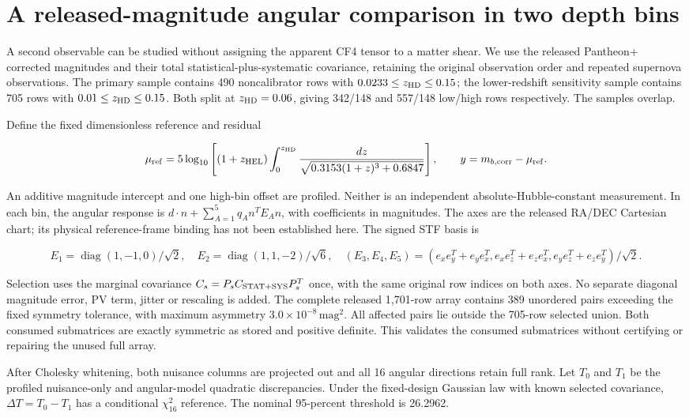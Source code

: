 \section{A released-magnitude angular comparison in two depth bins}
A second observable can be studied without assigning the apparent CF4
tensor to a matter shear. We use the released Pantheon+ corrected
magnitudes and their total statistical-plus-systematic covariance,
retaining the original observation order and repeated supernova
observations. The primary sample contains 490 noncalibrator rows with
\(0.0233\le z_{\rm HD}\le0.15\); the lower-redshift sensitivity sample
contains 705 rows with \(0.01\le z_{\rm HD}\le0.15\). Both split at
\(z_{\rm HD}=0.06\), giving 342/148 and 557/148 low/high rows
respectively. The samples overlap.

Define the fixed dimensionless reference and residual

\[
 \mu_{\rm ref}=5\log_{10}\left[(1+z_{\rm HEL})
 \int_0^{z_{\rm HD}}\frac{dz}{\sqrt{0.3153(1+z)^3+0.6847}}\right],
 \qquad y=m_{b,\rm corr}-\mu_{\rm ref}.
\]

An additive magnitude intercept and one high-bin offset are profiled.
Neither is an independent absolute-Hubble-constant measurement. In each
bin, the angular response is \(d\cdot n+\sum_{A=1}^5q_A n^TE_An\), with
coefficients in magnitudes. The axes are the released RA/DEC Cartesian
chart; its physical reference-frame binding has not been established
here. The signed STF basis is

\[
 E_1=\operatorname{diag}(1,-1,0)/\sqrt2,\quad
 E_2=\operatorname{diag}(1,1,-2)/\sqrt6,\quad
 (E_3,E_4,E_5)=(e_xe_y^T+e_ye_x^T,
 e_xe_z^T+e_ze_x^T,e_ye_z^T+e_ze_y^T)/\sqrt2.
\]

Selection uses the marginal covariance \(C_s=P_s C_{\rm STAT+SYS}P_s^T\)
once, with the same original row indices on both axes. No separate
diagonal magnitude error, PV term, jitter or rescaling is added. The
complete released 1,701-row array contains 389 unordered pairs exceeding
the fixed symmetry tolerance, with maximum asymmetry
\(3.0\times10^{-8}\,\mathrm{mag}^2\). All affected pairs lie outside the
705-row selected union. Both consumed submatrices are exactly symmetric
as stored and positive definite. This validates the consumed submatrices
without certifying or repairing the unused full array.

After Cholesky whitening, both nuisance columns are projected out and
all 16 angular directions retain full rank. Let \(T_0\) and \(T_1\) be
the profiled nuisance-only and angular-model quadratic discrepancies.
Under the fixed-design Gaussian law with known selected covariance,
\(\Delta T=T_0-T_1\) has a conditional \(\chi^2_{16}\) reference. The
nominal 95-percent threshold is 26.2962.

